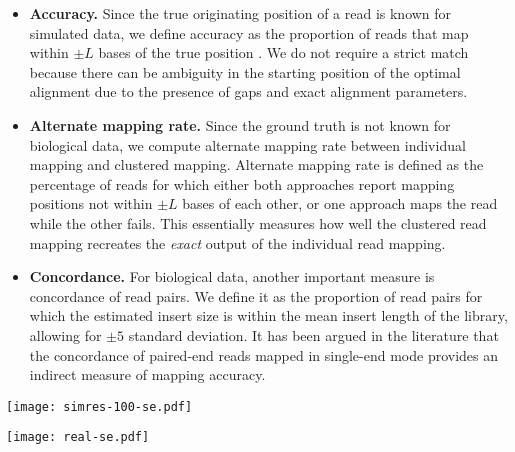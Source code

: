 \documentclass[a4paper]{article}
\begin{document}
\begin{itemize}
  \setlength{\itemsep}{1pt}
  \setlength{\parskip}{0pt}
  \setlength{\parsep}{0pt}
\item {\bf Accuracy.} Since the true originating
position of a read
is known for simulated data, we define accuracy as the proportion of reads that
map within $\pm L$ bases of the true position \cite{Hamada:2011bg}. We do
not require a
strict match because there can be
ambiguity in the starting position of the optimal alignment
due to the presence of gaps and exact alignment parameters.

\item {\bf Alternate mapping rate.} Since the ground truth is not known for biological data, we compute alternate mapping rate between individual mapping and clustered mapping. Alternate mapping rate is defined as the percentage of reads for which either both approaches
report mapping positions not within $\pm L$ bases of each other, or one approach maps the read while the other fails. 
This essentially measures how well the clustered read mapping recreates the {\em exact} output of the individual read mapping.

\item {\bf Concordance.} For biological data, another
important measure is concordance of read pairs. We define it as the
proportion of read pairs for which the estimated insert size is within
the mean insert length of the library, allowing for $\pm 5$ standard
deviation. It has been argued in the literature \cite{Lunter2011} that
the concordance of paired-end reads mapped in single-end mode provides an
indirect measure of mapping accuracy.
\end{itemize}


\begin{figure*}
\centering
\texttt{[image: simres-100-se.pdf]}
\caption{\label{fig:sim_res_se}
{\bf Quality improvements in detecting SNPs and structural variants.}
    Accuracy of mapping single-end simulated reads between individual and clustered approach
    is shown. As expected, BWA and Bowtie 2 do not perform very well in presence
    of large variations. Clustered read mapping performs significantly better
    than individual BWA and Bowtie 2, and generally agrees with the individual version
    of the sensitive readmappers.
}
\end{figure*}


\begin{figure*}
  \centering
  \texttt{[image: real-se.pdf]}
  \caption{ \label{fig:real-se}
  {\bf Alternate mapping rate between clustered and individual single-end read mapping.} Alternate mapping rate is shown as a function of MAPQ threshold. Maximum reported MAPQ value varies between readmappers; for BWA, Bowtie 2, Novoalign and Stampy maximum reported MAPQ for single-end reads are respectively 37, 42, 150 and 96. The cutoffs used to report alternate mapping rate in Table~\ref{runtime-se} are shown with diamond signs in the inset figures.}
  \vspace{-4mm}
\end{figure*}
\end{document}
